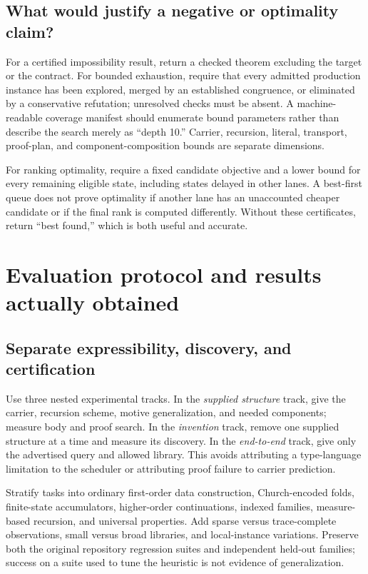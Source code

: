 \documentclass[11pt,a4paper]{article}
\theoremstyle{definition}
\theoremstyle{remark}
\begin{document}
\subsection{What would justify a negative or optimality claim?}

For a certified impossibility result, return a checked theorem excluding the target or the contract. For bounded exhaustion, require that every admitted production instance has been explored, merged by an established congruence, or eliminated by a conservative refutation; unresolved checks must be absent. A machine-readable coverage manifest should enumerate bound parameters rather than describe the search merely as ``depth 10.'' Carrier, recursion, literal, transport, proof-plan, and component-composition bounds are separate dimensions.

For ranking optimality, require a fixed candidate objective and a lower bound for every remaining eligible state, including states delayed in other lanes. A best-first queue does not prove optimality if another lane has an unaccounted cheaper candidate or if the final rank is computed differently. Without these certificates, return ``best found,'' which is both useful and accurate.

\section{Evaluation protocol and results actually obtained}\label{sec:evaluation}

\subsection{Separate expressibility, discovery, and certification}

Use three nested experimental tracks. In the \emph{supplied structure} track, give the carrier, recursion scheme, motive generalization, and needed components; measure body and proof search. In the \emph{invention} track, remove one supplied structure at a time and measure its discovery. In the \emph{end-to-end} track, give only the advertised query and allowed library. This avoids attributing a type-language limitation to the scheduler or attributing proof failure to carrier prediction.

Stratify tasks into ordinary first-order data construction, Church-encoded folds, finite-state accumulators, higher-order continuations, indexed families, measure-based recursion, and universal properties. Add sparse versus trace-complete observations, small versus broad libraries, and local-instance variations. Preserve both the original repository regression suites and independent held-out families; success on a suite used to tune the heuristic is not evidence of generalization.
\end{document}
